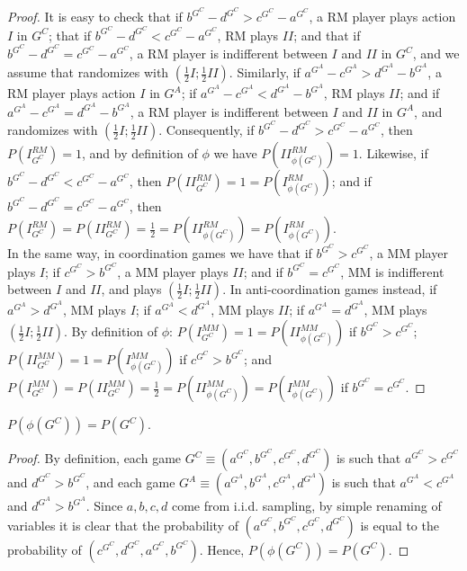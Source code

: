 \documentclass[fleqn,reqno,11pt]{article}
\begin{document}
\begin{proof}
It is easy to check that if $b^{G^{C}}-d^{G^{C}}>c^{G^{C}}-a^{G^{C}}$,
a RM player plays action $I$ in $G^{C}$; that if $b^{G^{C}}-d^{G^{C}}<c^{G^{C}}-a^{G^{C}}$,
RM plays $II$; and that if $b^{G^{C}}-d^{G^{C}}=c^{G^{C}}-a^{G^{C}}$,
a RM player is indifferent between $I$ and $II$ in $G^{C}$, and
we assume that randomizes with $(\frac{1}{2}I;\frac{1}{2}II)$. Similarly,
if $a^{G^{A}}-c^{G^{A}}>d^{G^{A}}-b^{G^{A}}$, a RM player plays action
$I$ in $G^{A}$; if $a^{G^{A}}-c^{G^{A}}<d^{G^{A}}-b^{G^{A}}$, RM
plays $II$; and if $a^{G^{A}}-c^{G^{A}}=d^{G^{A}}-b^{G^{A}}$, a
RM player is indifferent between $I$ and $II$ in $G^{A}$, and randomizes
with $(\frac{1}{2}I;\frac{1}{2}II)$. Consequently, if $b^{G^{C}}-d^{G^{C}}>c^{G^{C}}-a^{G^{C}}$,
then $P(I_{G^{C}}^{RM})=1$, and by definition of $\phi$ we have
$P(II_{\phi(G^{C})}^{RM})=1$. Likewise, if $b^{G^{C}}-d^{G^{C}}<c^{G^{C}}-a^{G^{C}}$,
then $P(II_{G^{C}}^{RM})=1=P(I_{\phi(G^{C})}^{RM})$; and if $b^{G^{C}}-d^{G^{C}}=c^{G^{C}}-a^{G^{C}}$,
then $P(I_{G^{C}}^{RM})=P(II_{G^{C}}^{RM})=\frac{1}{2}=P(II_{\phi(G^{C})}^{RM})=P(I_{\phi(G^{C})}^{RM})$. \\
In the same way, in coordination games we have that if $b^{G^{C}}>c^{G^{C}}$,
a MM player plays $I$; if $c^{G^{C}}>b^{G^{C}}$, a MM player plays
$II$; and if $b^{G^{C}}=c^{G^{C}}$, MM is indifferent between $I$
and $II$, and plays $(\frac{1}{2}I;\frac{1}{2}II)$. In anti-coordination
games instead, if $a^{G^{A}}>d^{G^{A}}$, MM plays $I$; if $a^{G^{A}}<d^{G^{A}}$,
MM plays $II$; if $a^{G^{A}}=d^{G^{A}}$, MM plays $(\frac{1}{2}I;\frac{1}{2}II)$.
By definition of $\phi$: $P(I_{G^{C}}^{MM})=1=P(II_{\phi(G^{C})}^{MM})$
if $b^{G^{C}}>c^{G^{C}}$; $P(II_{G^{C}}^{MM})=1=P(I_{\phi(G^{C})}^{MM})$
if $c^{G^{C}}>b^{G^{C}}$; and $P(I_{G^{C}}^{MM})=P(II_{G^{C}}^{MM})=\frac{1}{2}=P(II_{\phi(G^{C})}^{MM})=P(I_{\phi(G^{C})}^{MM})$
if $b^{G^{C}}=c^{G^{C}}$.
\end{proof}

\medskip{}

\begin{lemma}
$P(\phi(G^{C}))=P(G^{C})$.
\end{lemma}

\begin{proof}
By definition, each game $G^{C}\equiv(a^{G^{C}},b^{G^{C}},c^{G^{C}},d^{G^{C}})$
is such that $a^{G^{C}}>c^{G^{C}}$ and $d^{G^{C}}>b^{G^{C}}$, and
each game $G^{A}\equiv(a^{G^{A}},b^{G^{A}},c^{G^{A}},d^{G^{A}})$
is such that $a^{G^{A}}<c^{G^{A}}$ and $d^{G^{A}}>b^{G^{A}}$. Since
$a,b,c,d$ come from i.i.d. sampling, by simple renaming of variables
it is clear that the probability of $(a^{G^{C}},b^{G^{C}},c^{G^{C}},d^{G^{C}})$
is equal to the probability of $(c^{G^{C}},d^{G^{C}},a^{G^{C}},b^{G^{C}})$.
Hence, $P(\phi(G^{C}))=P(G^{C})$.
\end{proof}
\end{document}
